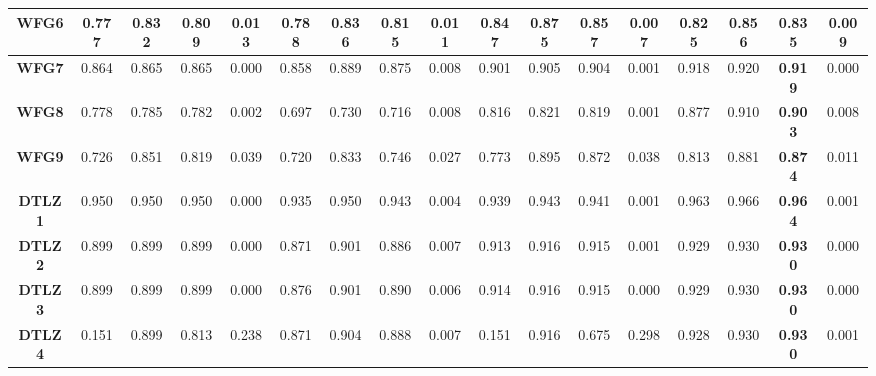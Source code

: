 \begin{table*}
{\begin{tabular}{c|c|c|c|c|c|c|c|c|c|c|c|c|c|c|c|c}
\hline
\textbf{WFG6}         & 0.777           & 0.832           & 0.809           & 0.013           & 0.788           & 0.836           & 0.815           & 0.011           & 0.847           & 0.875           & \textbf{0.857 } & 0.007           & 0.825           & 0.856           & 0.835           & 0.009            \\ 
\hline
\textbf{WFG7}         & 0.864           & 0.865           & 0.865           & 0.000           & 0.858           & 0.889           & 0.875           & 0.008           & 0.901           & 0.905           & 0.904           & 0.001           & 0.918           & 0.920           & \textbf{0.919 } & 0.000            \\ 
\hline
\textbf{WFG8}         & 0.778           & 0.785           & 0.782           & 0.002           & 0.697           & 0.730           & 0.716           & 0.008           & 0.816           & 0.821           & 0.819           & 0.001           & 0.877           & 0.910           & \textbf{0.903 } & 0.008            \\ 
\hline
\textbf{WFG9}         & 0.726           & 0.851           & 0.819           & 0.039           & 0.720           & 0.833           & 0.746           & 0.027           & 0.773           & 0.895           & 0.872           & 0.038           & 0.813           & 0.881           & \textbf{0.874 } & 0.011            \\ 
\hline
\textbf{DTLZ1}        & 0.950           & 0.950           & 0.950           & 0.000           & 0.935           & 0.950           & 0.943           & 0.004           & 0.939           & 0.943           & 0.941           & 0.001           & 0.963           & 0.966           & \textbf{0.964 } & 0.001            \\ 
\hline
\textbf{DTLZ2}        & 0.899           & 0.899           & 0.899           & 0.000           & 0.871           & 0.901           & 0.886           & 0.007           & 0.913           & 0.916           & 0.915           & 0.001           & 0.929           & 0.930           & \textbf{0.930 } & 0.000            \\ 
\hline
\textbf{DTLZ3}        & 0.899           & 0.899           & 0.899           & 0.000           & 0.876           & 0.901           & 0.890           & 0.006           & 0.914           & 0.916           & 0.915           & 0.000           & 0.929           & 0.930           & \textbf{0.930 } & 0.000            \\ 
\hline
\textbf{DTLZ4}        & 0.151           & 0.899           & 0.813           & 0.238           & 0.871           & 0.904           & 0.888           & 0.007           & 0.151           & 0.916           & 0.675           & 0.298           & 0.928           & 0.930           & \textbf{0.930 } & 0.001            \\ 

\end{tabular}}
\end{table*}
